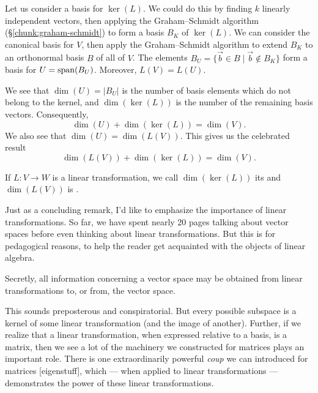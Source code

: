 Let us consider a basis for $\ker(L)$. We could do this by finding $k$
linearly independent vectors, then applying the Graham--Schmidt
algorithm (\S\ref{chunk:graham-schmidt}) to form a basis $B_{K}$ of
$\ker(L)$. We can consider the canonical basis for $V$, then apply the
Graham--Schmidt algorithm to extend $B_{K}$ to an orthonormal basis $B$ of
all of $V$. The elements $B_{U}=\{\vec{b}\in B\mid\vec{b}\notin B_{K}\}$
form a basis for $U=\operatorname{span}(B_{U})$. Moreover, $L(V)=L(U)$.

We see that $\dim(U)=|B_{U}|$ is the number of basis elements which do
not belong to the kernel, and $\dim(\ker(L))$ is the number of the
remaining basis vectors. Consequently,
\begin{equation}
\dim(U) + \dim(\ker(L)) = \dim(V).
\end{equation}
We also see that $\dim(U)=\dim(L(V))$. This gives us the celebrated
result
\begin{equation}
\boxed{\dim(L(V)) + \dim(\ker(L)) = \dim(V).}
\end{equation}

\begin{definition}
  If $L\colon V\to W$ is a linear transformation, we call
  $\dim(\ker(L))$ its  and $\dim(L(V))$ is
  .
\end{definition}

Just as a concluding remark, I'd like to emphasize the importance of
linear transformations. So far, we have spent nearly 20 pages talking
about vector spaces before even thinking about linear
transformations. But this is for pedagogical reasons, to help the reader
get acquainted with the objects of linear algebra.

Secretly, all information concerning a vector space may be obtained from
linear transformations to, or from, the vector space.

This sounds preposterous and conspiratorial. But every possible subspace
is a kernel of some linear transformation (and the image of another).
Further, if we realize that a
linear transformation, when expressed relative to a basis, is a matrix,
then we see a lot of the machinery we constructed for matrices plays an
important role. There is one extraordinarily powerful \emph{coup} we can
introduced for matrices [eigenstuff], which --- when applied to linear
transformations --- demonstrates the power of these linear
transformations.
